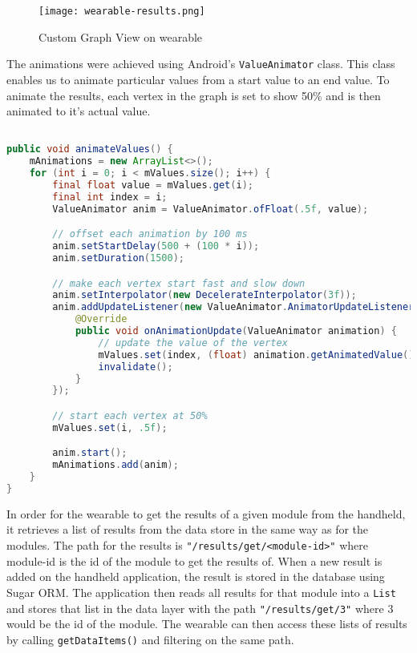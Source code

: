 \begin{figure}
    \centering
    \texttt{[image: wearable-results.png]}
    \caption{Custom Graph View on wearable}
    \label{fig:wearable_results}
\end{figure}

The animations were achieved using Android's \texttt{ValueAnimator} class. This
class enables us to animate particular values from a start value to an end
value. To animate the results, each vertex in the graph is set to show 50\% and
is then animated to it's actual value.

\begin{lstlisting}[language=Java]

public void animateValues() {
    mAnimations = new ArrayList<>();
    for (int i = 0; i < mValues.size(); i++) {
        final float value = mValues.get(i);
        final int index = i;
        ValueAnimator anim = ValueAnimator.ofFloat(.5f, value);

        // offset each animation by 100 ms
        anim.setStartDelay(500 + (100 * i));
        anim.setDuration(1500);

        // make each vertex start fast and slow down
        anim.setInterpolator(new DecelerateInterpolator(3f));
        anim.addUpdateListener(new ValueAnimator.AnimatorUpdateListener() {
            @Override
            public void onAnimationUpdate(ValueAnimator animation) {
                // update the value of the vertex
                mValues.set(index, (float) animation.getAnimatedValue());
                invalidate();
            }
        });

        // start each vertex at 50%
        mValues.set(i, .5f);

        anim.start();
        mAnimations.add(anim);
    }
}

\end{lstlisting}

In order for the wearable to get the results of a given module from the
handheld, it retrieves a list of results from the data store in the same way
as for the modules. The path for the results is
\texttt{"/results/get/<module-id>"} where module-id is the id of the module to
get the results of. When a new result is added on the handheld application, the
result is stored in the database using Sugar ORM. The application then reads all
results for that module into a \texttt{List} and stores that list in the data
layer with the path \texttt{"/results/get/3"} where 3 would be the id of the
module. The wearable can then access these lists of results by calling
\texttt{getDataItems()} and filtering on the same path.

